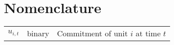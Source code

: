 \chapter*{Nomenclature}

\begin{tabular}{lll}
  $u_{i, t}$ & binary & Commitment of unit $i$ at time $t$ 
\end{tabular}